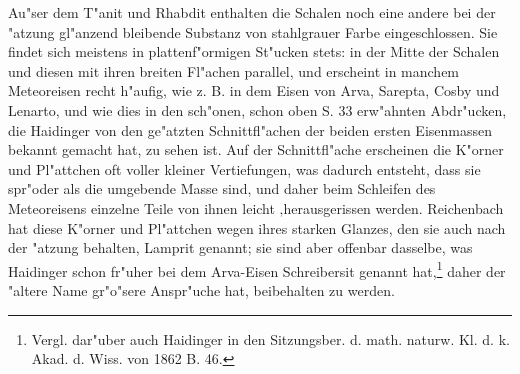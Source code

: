 \documentclass[a4paper, 11pt, oneside, german]{article}
\begin{document}
Au"ser dem T"anit und Rhabdit enthalten die Schalen noch eine andere bei der "atzung gl"anzend bleibende Substanz von stahlgrauer Farbe eingeschlossen. Sie findet sich meistens in plattenf"ormigen St"ucken stets: in der Mitte der Schalen und diesen mit ihren breiten Fl"achen parallel, und erscheint in manchem Meteoreisen recht h"aufig, wie z. B. in dem Eisen von Arva, Sarepta, Cosby und Lenarto, und wie dies in den sch"onen, schon oben S. 33 erw"ahnten Abdr"ucken, die Haidinger von den ge"atzten Schnittfl"achen der beiden ersten Eisenmassen bekannt gemacht hat, zu sehen ist. Auf der Schnittfl"ache erscheinen die K"orner und Pl"attchen oft voller kleiner Vertiefungen, was dadurch entsteht, dass sie spr"oder als die umgebende Masse sind, und daher beim Schleifen des Meteoreisens einzelne Teile von ihnen leicht ‚herausgerissen werden. Reichenbach hat diese K"orner und Pl"attchen wegen ihres starken Glanzes, den sie auch nach der "atzung behalten, Lamprit genannt; sie sind aber offenbar dasselbe, was Haidinger schon fr"uher bei dem Arva-Eisen Schreibersit genannt hat,\footnote{Vergl. dar"uber auch Haidinger in den Sitzungsber. d. math. naturw. Kl. d. k. Akad. d. Wiss. von 1862 B. 46.} daher der "altere Name gr"o"sere Anspr"uche hat, beibehalten zu werden.
\end{document}

